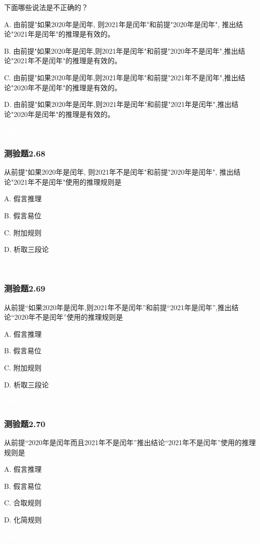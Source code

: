 \documentclass[UTF8, heading=true]{ctexart}
\begin{document}
下面哪些说法是不正确的？

A. 由前提"如果2020年是闰年, 则2021年是闰年"和前提"2020年是闰年", 推出结论"2021年是闰年"的推理是有效的。

B. 由前提"如果2020年是闰年,则2021年是闰年"和前提"2020年不是闰年",推出结论"2021年不是闰年"的推理是有效的。

C. 由前提"如果2020年是闰年,则2021年是闰年"和前提"2021年不是闰年",推出结论"2020年不是闰年"的推理是有效的。

D. 由前提"如果2020年是闰年,则2021年是闰年"和前提"2021年是闰年",推出结论"2020年是闰年"的推理是有效的。

\textcolor{white}{答案：BD}

\subsubsection{测验题2.68}

从前提"如果2020年是闰年, 则2021年不是闰年"和前提"2020年是闰年", 推出结论"2021年不是闰年"使用的推理规则是

A. 假言推理

B. 假言易位

C. 附加规则

D. 析取三段论

\textcolor{white}{答案：A}

\subsubsection{测验题2.69}

从前提“如果2020年是闰年,则2021年不是闰年”和前提“2021年是闰年”,推出结论“2020年不是闰年”使用的推理规则是

A. 假言推理

B. 假言易位

C. 附加规则

D. 析取三段论

\textcolor{white}{答案：B}

\subsubsection{测验题2.70}

从前提“2020年是闰年而且2021年不是闰年”推出结论“2021年不是闰年”使用的推理规则是

A. 假言推理

B. 假言易位

C. 合取规则

D. 化简规则

\textcolor{white}{答案：D}
\end{document}
